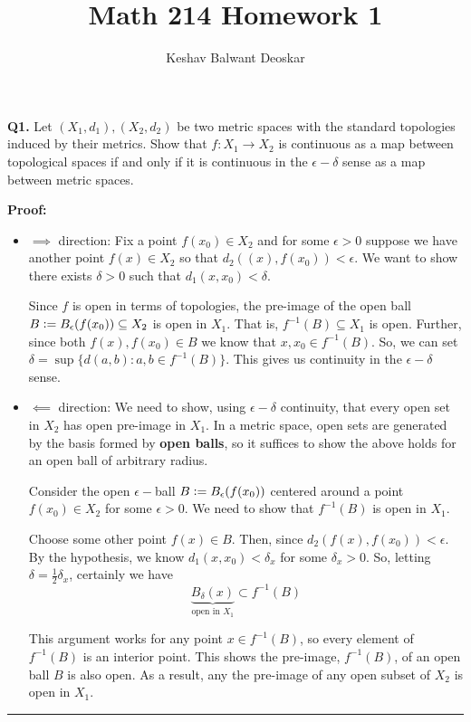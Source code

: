 \documentclass{article}
\title{Math 214 Homework 1}
\author{Keshav Balwant Deoskar}
\newcommand{\defeq}{\vcentcolon=}
\begin{document}
\maketitle



\textbf{Q1.} Let $(X_1, d_1), (X_2, d_2)$ be two metric spaces with the standard topologies induced by their metrics. Show that $f : X_1 \rightarrow X_2$ is continuous as a map between topological spaces if and only if it is continuous in the $\epsilon - \delta$ sense as a map between metric spaces.

\vskip 0.5cm
\textbf{Proof:} 

\begin{itemize}
  \item $\implies$ direction: Fix a point $f(x_0) \in X_2$ and for some $\epsilon > 0$ suppose we have another point $f(x) \in X_2$ so that  $d_2((x), f(x_0)) < \epsilon$. We want to show there exists $\delta > 0$ such that $d_1(x, x_0) < \delta$.
  \vskip 0.25cm
  
  Since $f$ is open in terms of topologies, the pre-image of the open ball $B \defeq B_{\epsilon}(f(x_0)) \subseteq X_2$ is open in $X_1$. That is, $f^{-1}(B) \subseteq X_1$ is open. Further, since both $f(x), f(x_0) \in B$ we know that $x, x_0 \in f^{-1}(B)$. So, we can set $\delta = \sup \{ d(a, b) : a, b \in f^{-1}(B) \}$. This gives us continuity in the $\epsilon-\delta$ sense.

  \vskip 0.5cm
  \item $\impliedby$ direction: We need to show, using $\epsilon-\delta$ continuity, that every open set in $X_2$ has open pre-image in $X_1$. In a metric space, open sets are generated by the basis formed by \textbf{open balls}, so it suffices to show the above holds for an open ball of arbitrary radius.
  
  \vskip 0.25cm
  Consider the open $\epsilon-$ball $B \defeq B_{\epsilon}(f(x_0))$ centered around a point $f(x_0) \in X_2$ for some $\epsilon > 0$. We need to show that $f^{-1}(B)$ is open in $X_1$.

  Choose some other point $f(x) \in B$. Then, since $d_2(f(x), f(x_0)) < \epsilon$. By the hypothesis, we know $d_1 (x, x_0) < \delta_x$ for some $\delta_x > 0$. So, letting $\delta = \frac{1}{2} \delta_x$, certainly we have 
  \[ \underbrace{B_{\delta}(x)}_{\text{open in }X_1} \subset f^{-1}(B) \]

  This argument works for any point $x \in f^{-1}(B)$, so every element of $f^{-1}(B)$ is an interior point. This shows the pre-image, $f^{-1}(B)$, of an open ball $B$ is also open. As a result, any the pre-image of any open subset of $X_2$ is open in $X_1$.
\end{itemize}
\vskip 0.5cm
\hrule 
\end{document}
